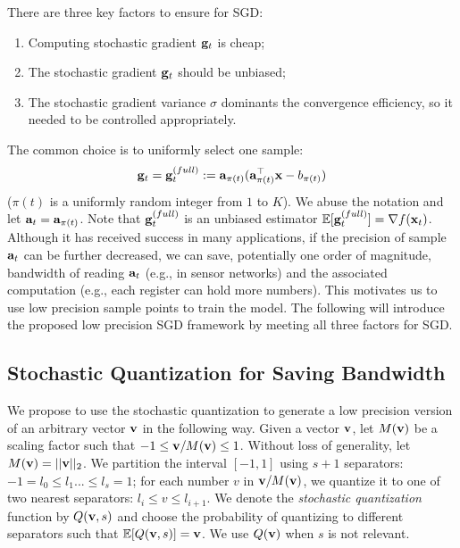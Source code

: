 There are three key factors to ensure for SGD:
\begin{enumerate}
\vspace{-0.5em}
\item Computing stochastic gradient ${\bf g}_t$ is cheap;
\vspace{-0.5em}
\item The stochastic gradient ${\bf g}_t$ should be unbiased;
\vspace{-0.5em}
\item The stochastic gradient variance $\sigma$ dominants the convergence efficiency, so it needed to be controlled appropriately.
\end{enumerate}
\vspace{-0.5em}
The common choice is to uniformly select one sample:
\vspace{-0.5em}
\begin{align}
{\bf g}_t = {\bf g}_t^{(full)} := {\bf a}_{\pi(t)} ({\bf a}_{\pi(t)}^\top {\bf x} - b_{\pi(t)})
\label{eq:sgfull}
\end{align} 
($\pi(t)$ is a uniformly random integer from $1$ to $K$). We abuse the notation and let ${\bf a}_t = {\bf a}_{\pi(t)}$. Note that ${\bf g}_t^{(full)}$ is an unbiased estimator $\mathbb{E} [{\bf g}_t^{(full)}] = \nabla f({\bf x}_t)$. Although it has received success in many applications, 
if the precision of sample ${\bf a}_{t}$ can be further decreased,
we can save, potentially one order of magnitude, bandwidth
of reading ${\bf a}_{t}$ (e.g., in sensor networks) and the associated computation (e.g.,
each register can hold more numbers). 
This motivates us to use low precision sample points to train the model. The following will introduce the proposed low precision SGD framework by meeting all three factors for SGD.


\vspace{-0.5em}
\subsection{Stochastic Quantization for Saving Bandwidth} 
\vspace{-0.5em}

We propose to use the stochastic quantization to generate a low precision version of an arbitrary vector ${\bf v}$ in the following 
way. Given a vector
${\bf v}$, let $M({\bf v})$ be a scaling factor such that $-1 \le {\bf v}/M({\bf v}) \le 1$. Without loss of generality, let $M({\bf v})=||{\bf v}||_2$. We partition the interval $[-1, 1]$ using $s+1$ separators: $-1 = l_0 \le l_1 ... \le l_{s} = 1$; for each number $v$ in ${\bf v}/M({\bf v})$, we 
quantize it to one of two nearest separators: $l_i \le v \le l_{i+1}$. We denote the \emph{stochastic quantization} function by $Q({\bf v}, s)$ and choose the probability of quantizing to different separators such that $\mathbb{E}[Q({\bf v}, s)] = {\bf v}$. We use $Q({\bf v})$ when $s$ is not relevant.

